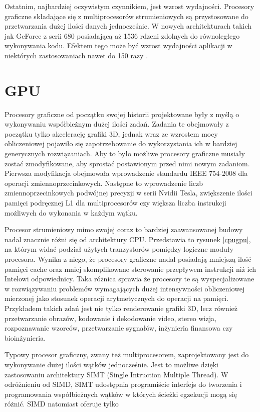Ostatnim, najbardziej oczywistym czynnikiem, jest wzrost wydajności. Procesory
graficzne składające się z multiprocesorów strumieniowych są przystosowane do
przetwarzania dużej ilości danych jednocześnie. W nowych architekturach takich
jak GeForce z serii 680 posiadającą aż 1536 rdzeni zdolnych do równoległego
wykonywania kodu. Efektem tego może być wzrost wydajności aplikacji w niektórych
zastosowaniach nawet do 150 razy \cite{prez}.

\section{GPU}

Procesory graficzne od początku swojej historii projektowane były z myślą o
wykonywaniu współbieżnym dużej ilości zadań. Zadania te obejmowały z początku
tylko akcelerację grafiki 3D, jednak wraz ze wzrostem mocy obliczeniowej
pojawiło się zapotrzebowanie do wykorzystania ich w bardziej
generycznych rozwiązaniach. Aby to było możliwe procesory graficzne musiały
zostać zmodyfikowane, aby sprostać postawionym przed nimi nowym zadaniom.
Pierwsza modyfikacja obejmowała wprowadzenie standardu IEEE 754-2008 dla
operacji zmiennoprzecinkowych. Następne to wprowadzenie liczb
zmiennoprzecinkowych podwójnej precyzji w serii Nvidii Tesla, zwiększenie ilości
pamięci podręcznej L1 dla multiprocesorów czy większa liczba instrukcji
możliwych do wykonania w każdym wątku.

Procesor strumieniowy mimo swojej coraz to bardziej zaawansowanej budowy nadal
znacznie różni się od architektury CPU. Przedstawia to rysunek \ref{cpugpu}, na
którym widać podział użytych tranzystorów pomiędzy logiczne moduły procesora.
Wynika z niego, że procesory graficzne nadal posiadają mniejszą ilość pamięci cache oraz
mniej skomplikowane sterowanie przepływem instrukcji niż ich Intelowi
odpowiednicy. Taka różnica sprawia że procesory te są wyspecjalizowane w rozwiązywaniu
problemów wymagających dużej intensywności obliczeniowej mierzonej jako stosunek
operacji arytmetycznych do operacji na pamięci. Przykładem takich zdań jest nie tylko 
renderowanie grafiki 3D, lecz również przetwarzanie obrazów, kodowanie i
dekodowanie video, stereo wizja, rozpoznawanie wzorców, przetwarzanie sygnałów,
inżynieria finansowa czy bioinżynieria.

Typowy procesor graficzny, zwany też multiprocesorem, zaprojektowany jest do
wykonywanie dużej ilości wątków jednocześnie. Jest to możliwe dzięki
zastosowaniu architektury SIMT (Single Intruction Multiple Thread). W
odróżnieniu od SIMD, SIMT udostępnia programiście interfejs do tworzenia i programowania
współbieżnych wątków w których ścieżki egzekucji mogą się różnić. SIMD natomiast
oferuje tylko 

